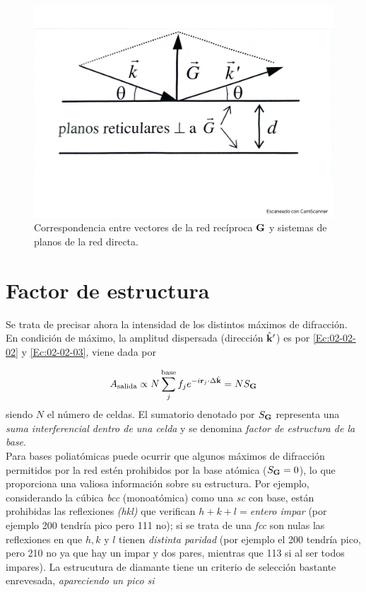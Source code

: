 \begin{figure}[h!] \centering
    \includegraphics[scale=0.35]{Cuerpo/Ch_02/Fotos_libro 7.pdf}
    \caption{Correspondencia entre vectores de la red recíproca $\mathbf{G}$ y sistemas de planos de la red directa.}
    \label{Fig:02-07}
\end{figure}

\section{Factor de estructura}

Se trata de precisar ahora la intensidad de los distintos máximos de difracción. En condición de máximo, la amplitud dispersada (dirección $\hat{\mathbf{k}}'$) es por \ref{Ec:02-02-02} y \ref{Ec:02-02-03}, viene dada por 

\begin{equation}
    A_{\text{salida}} \propto N \sum_j^{\text{base}} f_j e^{-i\mathbf{r}_j \cdot \Delta \hat{\mathbf{k}}} = N S_{\mathbf{G}}
\end{equation}
siendo $N$ el número de celdas. El sumatorio denotado por $S_{\mathbf{G}}$ representa una \textit{suma interferencial dentro de una celda} y se denomina \textit{factor de estructura de la base}.  \\

Para bases poliatómicas puede ocurrir que algunos máximos de difracción permitidos por la red estén prohibidos por la base atómica ($S_{\mathbf{G}}=0$), lo que proporciona una valiosa información sobre su estructura. Por ejemplo, considerando la cúbica \textit{bcc} (monoatómica) como una \textit{sc} con base, están prohibidas las reflexiones \textit{(hkl)} que verifican $h+k+l=$\textit{entero impar} (por ejemplo 200 tendría pico pero 111 no); si se trata de una {\it fcc}  son nulas las reflexiones en que $h,k$ y $l$ tienen \textit{distinta paridad} (por ejemplo el 200 tendría pico, pero 210 no ya que hay un impar y dos pares, mientras que 113 si al ser todos impares). La estrucutura de diamante tiene un criterio de selección bastante enrevesada, \textit{apareciendo un pico si}

